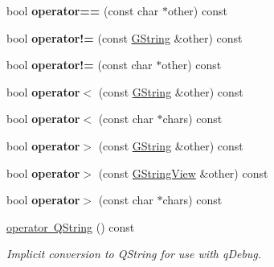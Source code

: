 \begin{DoxyCompactItemize}
bool {\bfseries operator==} (const char $\ast$other) const
\item 
\mbox{\label{classrev_1_1_g_string_view_a80b111cb780dca6a41f1b5684bcfb4f3}} 
bool {\bfseries operator!=} (const \mbox{\hyperlink{classrev_1_1_g_string}{G\+String}} \&other) const
\item 
\mbox{\label{classrev_1_1_g_string_view_a9895c768a6919c912104f88ca70a3a02}} 
bool {\bfseries operator!=} (const char $\ast$other) const
\item 
\mbox{\label{classrev_1_1_g_string_view_a650344f59e88a4eeaeea3a43885558a4}} 
bool {\bfseries operator$<$} (const \mbox{\hyperlink{classrev_1_1_g_string}{G\+String}} \&other) const
\item 
\mbox{\label{classrev_1_1_g_string_view_a8ad64ee9a55ee2cbb7359b1d4593434d}} 
bool {\bfseries operator$<$} (const char $\ast$chars) const
\item 
\mbox{\label{classrev_1_1_g_string_view_ab7a0826a2b55b40af15eacb521b75f5b}} 
bool {\bfseries operator$>$} (const \mbox{\hyperlink{classrev_1_1_g_string}{G\+String}} \&other) const
\item 
\mbox{\label{classrev_1_1_g_string_view_a725981a9006a5276811eae6a3bb2bd09}} 
bool {\bfseries operator$>$} (const \mbox{\hyperlink{classrev_1_1_g_string_view}{G\+String\+View}} \&other) const
\item 
\mbox{\label{classrev_1_1_g_string_view_a73e438164d8a5674a1bd7cf9c156129f}} 
bool {\bfseries operator$>$} (const char $\ast$chars) const
\item 
\mbox{\label{classrev_1_1_g_string_view_a4dab54c33d8d21b3b12a5cde1ba20456}} 
\mbox{\hyperlink{classrev_1_1_g_string_view_a4dab54c33d8d21b3b12a5cde1ba20456}{operator Q\+String}} () const
\begin{DoxyCompactList}\small\item\em Implicit conversion to Q\+String for use with q\+Debug. \end{DoxyCompactList}\item 

\end{DoxyCompactItemize}
